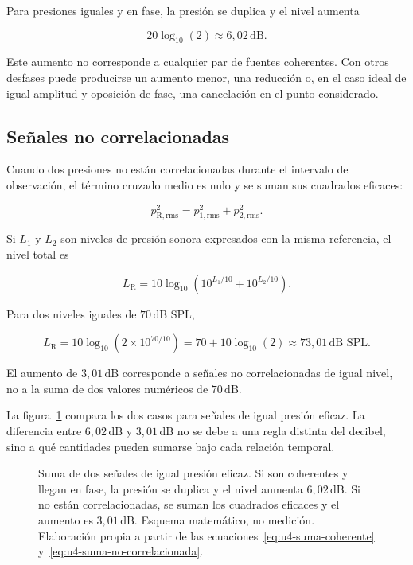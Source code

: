 Para presiones iguales y en fase, la presión se duplica y el nivel aumenta

\[
    20\log_{10}(2)\approx6{,}02\,\text{dB}.
\]

Este aumento no corresponde a cualquier par de fuentes coherentes. Con otros
desfases puede producirse un aumento menor, una reducción o, en el caso ideal
de igual amplitud y oposición de fase, una cancelación en el punto considerado.

\subsection{Señales no correlacionadas}
\label{sec:u4-fuentes-no-correlacionadas}

Cuando dos presiones no están correlacionadas durante el intervalo de
observación, el término cruzado medio es nulo y se suman sus cuadrados
eficaces:

\begin{equation}
    p_{\mathrm{R,rms}}^2
      =p_{1,\mathrm{rms}}^2+p_{2,\mathrm{rms}}^2.
    \label{eq:u4-suma-no-correlacionada}
\end{equation}

Si \(L_1\) y \(L_2\) son niveles de presión sonora expresados con la misma
referencia, el nivel total es

\begin{equation}
    L_\mathrm{R}
      =10\log_{10}\!\left(
        10^{L_1/10}+10^{L_2/10}\right).
    \label{eq:u4-suma-niveles}
\end{equation}

Para dos niveles iguales de \(70\,\text{dB SPL}\),

\[
    L_\mathrm{R}
      =10\log_{10}\!\left(
        2\times10^{70/10}\right)
      =70+10\log_{10}(2)
      \approx73{,}01\,\text{dB SPL}.
\]

El aumento de \(3{,}01\,\text{dB}\) corresponde a señales no correlacionadas
de igual nivel, no a la suma de dos valores numéricos de \(70\,\text{dB}\).

La figura~\ref{fig:u4-suma-coherente-no-correlacionada} compara los dos casos
para señales de igual presión eficaz. La diferencia entre \(6{,}02\,\text{dB}\)
y \(3{,}01\,\text{dB}\) no se debe a una regla distinta del decibel, sino a
qué cantidades pueden sumarse bajo cada relación temporal.

\begin{figure}[htbp]
    \centering
    
    \caption{Suma de dos señales de igual presión eficaz. Si son coherentes y
    llegan en fase, la presión se duplica y el nivel aumenta
    \(6{,}02\,\text{dB}\). Si no están correlacionadas, se suman los cuadrados
    eficaces y el aumento es \(3{,}01\,\text{dB}\). Esquema matemático, no
    medición. Elaboración propia a partir de las
    ecuaciones~\eqref{eq:u4-suma-coherente}
    y~\eqref{eq:u4-suma-no-correlacionada}.}
    \label{fig:u4-suma-coherente-no-correlacionada}
\end{figure}

